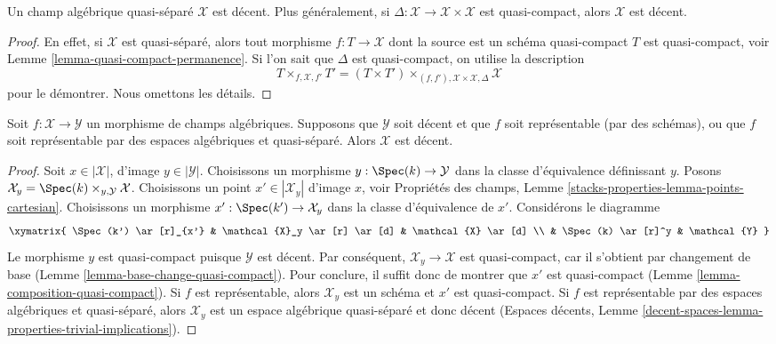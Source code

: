 \begin{lemma}
\label{lemma-quasi-separated-decent}
Un champ algébrique quasi-séparé $\mathcal{X}$ est décent.
Plus généralement, si $\Delta : \mathcal{X} \to \mathcal{X} \times \mathcal{X}$
est quasi-compact, alors $\mathcal{X}$ est décent.
\end{lemma}

\begin{proof}
En effet, si $\mathcal{X}$ est quasi-séparé, alors
tout morphisme $f : T \to \mathcal{X}$ dont la source est un schéma
quasi-compact $T$ est quasi-compact, voir
Lemme \ref{lemma-quasi-compact-permanence}.
Si l'on sait que $\Delta$ est quasi-compact, on utilise la description
$$
T \times_{f, \mathcal{X}, f'} T' =
(T \times T')
\times_{(f, f'), \mathcal{X} \times \mathcal{X}, \Delta}
\mathcal{X}
$$
pour le démontrer. Nous omettons les détails.
\end{proof}

\begin{lemma}
\label{lemma-representable-decent}
Soit $f : \mathcal{X} \to \mathcal{Y}$ un morphisme
de champs algébriques. Supposons que $\mathcal{Y}$ soit décent
et que $f$ soit représentable (par des schémas), ou que $f$ soit représentable
par des espaces algébriques et quasi-séparé.
Alors $\mathcal{X}$ est décent.
\end{lemma}

\begin{proof}
Soit $x \in |\mathcal{X}|$, d'image $y \in |\mathcal{Y}|$.
Choisissons un morphisme $y : \Spec(k) \to \mathcal{Y}$
dans la classe d'équivalence définissant $y$.
Posons $\mathcal{X}_y = \Spec(k) \times_{y, \mathcal{Y}} \mathcal{X}$.
Choisissons un point $x' \in |\mathcal{X}_y|$ d'image $x$, voir
Propriétés des champs, Lemme \ref{stacks-properties-lemma-points-cartesian}.
Choisissons un morphisme $x' : \Spec(k') \to \mathcal{X}_y$ dans la classe
d'équivalence de $x'$. Considérons le diagramme
$$
\xymatrix{
\Spec(k') \ar[r]_{x'} &
\mathcal{X}_y \ar[r] \ar[d] &
\mathcal{X} \ar[d] \\
&
\Spec(k) \ar[r]^y &
\mathcal{Y}
}
$$
Le morphisme $y$ est quasi-compact puisque $\mathcal{Y}$ est décent.
Par conséquent, $\mathcal{X}_y \to \mathcal{X}$ est quasi-compact, car il
s'obtient par changement de base
(Lemme \ref{lemma-base-change-quasi-compact}).
Pour conclure, il suffit donc de montrer que $x'$ est quasi-compact
(Lemme \ref{lemma-composition-quasi-compact}).
Si $f$ est représentable, alors $\mathcal{X}_y$ est un schéma
et $x'$ est quasi-compact.
Si $f$ est représentable par des espaces algébriques et quasi-séparé,
alors $\mathcal{X}_y$ est un espace algébrique quasi-séparé
et donc décent (Espaces décents, Lemme
\ref{decent-spaces-lemma-properties-trivial-implications}).
\end{proof}


